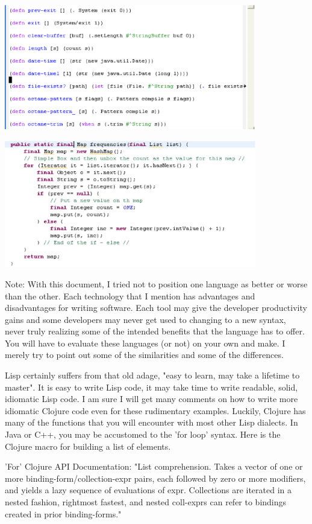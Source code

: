 \includegraphics[width=110mm]{lisp_3.eps}

\includegraphics[width=110mm]{java_4.eps}

Note: With this document, I tried not to position one language as better or worse than the other. Each technology that I mention has advantages and disadvantages for writing software. Each tool may give the developer productivity gains and some developers may never get used to changing to a new syntax, never truly realizing some of the intended benefits that the language has to offer. You will have to evaluate these languages (or not) on your own and make. I merely try to point out some of the similarities and some of the differences.

Lisp certainly suffers from that old adage, "easy to learn, may take a lifetime to master". It is easy to write Lisp code, it may take time to write readable, solid, idiomatic Lisp code. I am sure I will get many comments on how to write more idiomatic Clojure code even for these rudimentary examples. Luckily, Clojure has many of the functions that you will encounter with most other Lisp dialects. In Java or C++, you may be accustomed to the 'for loop' syntax. Here is the Clojure macro for building a list of elements.

'For' Clojure API Documentation: "List comprehension. Takes a vector of one or more binding-form/collection-expr pairs, each followed by zero or more modifiers, and yields a lazy sequence of evaluations of expr. Collections are iterated in a nested fashion, rightmost fastest, and nested coll-exprs can refer to bindings created in prior binding-forms."

